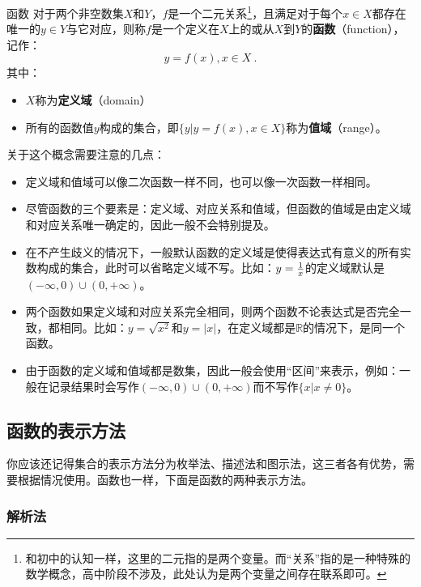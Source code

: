\begin{definition}{函数}\label{def_functi_1}
对于两个非空数集$X$和$Y$，$f$是一个二元关系\footnote{和初中的认知一样，这里的二元指的是两个变量。而“关系”指的是一种特殊的数学概念，高中阶段不涉及，此处认为是两个变量之间存在联系即可。}，且满足对于每个$x\in X$都存在唯一的$y\in Y$与它对应，则称$f$是一个定义在$X$上的或从$X$到$Y$的\textbf{函数}（function），记作：
\begin{equation}
y=f(x),x\in X~.
\end{equation}
其中：
\begin{itemize}
\item $X$称为\textbf{定义域}（domain）
\item 所有的函数值$y$构成的集合，即$\{y|y=f(x),x\in X\}$称为\textbf{值域}（range）。
\end{itemize}
\end{definition}

关于这个概念需要注意的几点：
\begin{itemize}
\item 定义域和值域可以像二次函数一样不同，也可以像一次函数一样相同。
\item 尽管函数的三个要素是：定义域、对应关系和值域，但函数的值域是由定义域和对应关系唯一确定的，因此一般不会特别提及。
\item 在不产生歧义的情况下，一般默认函数的定义域是使得表达式有意义的所有实数构成的集合，此时可以省略定义域不写。比如：$y={1\over x}$的定义域默认是$(-\infty,0)\cup(0,+\infty)$。
\item 两个函数如果定义域和对应关系完全相同，则两个函数不论表达式是否完全一致，都相同。比如：$y=\sqrt{x^2}$和$y=|x|$，在定义域都是$\mathbb R$的情况下，是同一个函数。
\item 由于函数的定义域和值域都是数集，因此一般会使用“区间”来表示，例如：一般在记录结果时会写作$(-\infty,0)\cup(0,+\infty)$而不写作$\{x|x\neq0\}$。
\end{itemize}



\subsection{函数的表示方法}

你应该还记得集合的表示方法分为枚举法、描述法和图示法，这三者各有优势，需要根据情况使用。函数也一样，下面是函数的两种表示方法。

\subsubsection{解析法}

